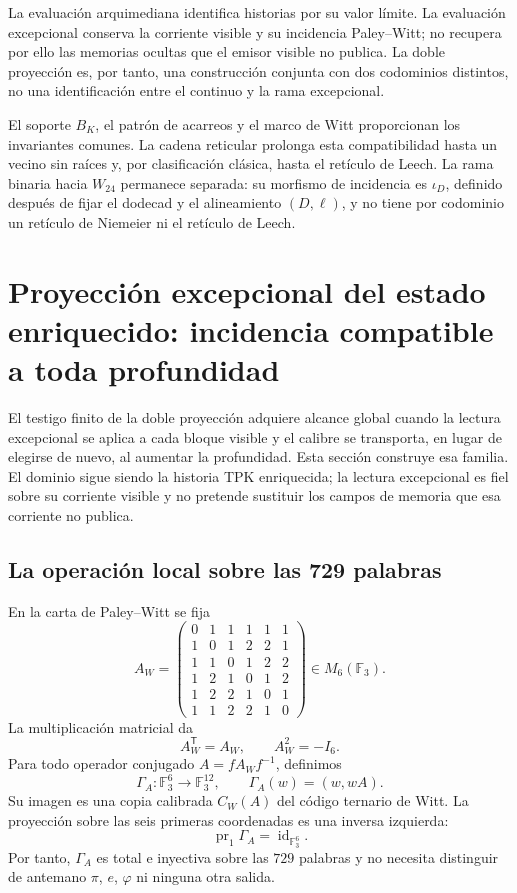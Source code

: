 La evaluación arquimediana identifica historias por su valor límite. La
evaluación excepcional conserva la corriente visible y su incidencia
Paley--Witt; no recupera por ello las memorias ocultas que el emisor visible
no publica. La doble proyección es, por tanto, una construcción conjunta con
dos codominios distintos, no una identificación entre el continuo y la rama
excepcional.

\begin{remark}
El soporte \(B_K\), el patrón de acarreos y el marco de Witt proporcionan los
invariantes comunes. La cadena reticular prolonga esta compatibilidad hasta un
vecino sin raíces y, por clasificación clásica, hasta el retículo de Leech. La
rama binaria hacia \(W_{24}\) permanece separada: su morfismo de incidencia es
\(\iota_D\), definido después de fijar el dodecad y el alineamiento
\((D,\ell)\), y no tiene por codominio un retículo de Niemeier ni el retículo
de Leech.
\end{remark}


\section{Proyección excepcional del estado enriquecido: incidencia compatible a toda profundidad}
\label{p12-83-c17-s2:chap:lector-excepcional-global-rev6}

El testigo finito de la doble proyección adquiere alcance global cuando la
lectura excepcional se aplica a cada bloque visible y el calibre se
transporta, en lugar de elegirse de nuevo, al aumentar la profundidad. Esta
sección construye esa familia. El dominio sigue siendo la historia TPK
enriquecida; la lectura excepcional es fiel sobre su corriente visible y no
pretende sustituir los campos de memoria que esa corriente no publica.

\subsection{La operación local sobre las 729 palabras}

En la carta de Paley--Witt se fija
\[
A_W=
\begin{pmatrix}
0&1&1&1&1&1\\
1&0&1&2&2&1\\
1&1&0&1&2&2\\
1&2&1&0&1&2\\
1&2&2&1&0&1\\
1&1&2&2&1&0
\end{pmatrix}
\in M_6(\mathbb F_3).
\]
La multiplicación matricial da
\[
A_W^{\mathsf T}=A_W,\qquad A_W^2=-I_6.
\]
Para todo operador conjugado \(A=fA_Wf^{-1}\), definimos
\[
\Gamma_A:\mathbb F_3^6\longrightarrow\mathbb F_3^{12},
\qquad
\Gamma_A(w)=(w,wA).
\]
Su imagen es una copia calibrada \(C_W(A)\) del código ternario de Witt.
La proyección sobre las seis primeras coordenadas es una inversa izquierda:
\[
\operatorname{pr}_1\Gamma_A=\operatorname{id}_{\mathbb F_3^6}.
\]
Por tanto, \(\Gamma_A\) es total e inyectiva sobre las \(729\) palabras y
no necesita distinguir de antemano \(\pi\), \(e\), \(\varphi\) ni ninguna
otra salida.

